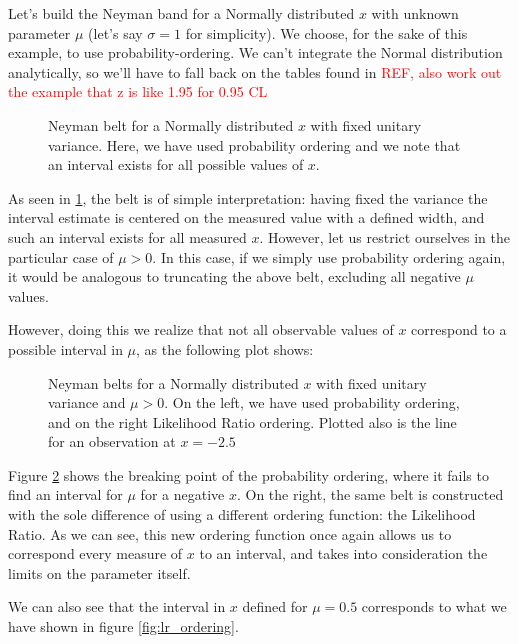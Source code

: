 \begin{example}
\label{ex:LR_vs_p_ordering}
	Let's build the Neyman band for a Normally distributed $x$ with unknown parameter $\mu$ (let's say $\sigma=1$ for simplicity). We choose, for the sake of this example, to use probability-ordering. We can't integrate the Normal distribution analytically, so we'll have to fall back on the tables found in \textcolor{red}{REF, also work out the example that z is like 1.95 for 0.95 CL}
	
	\begin{figure}[H]
		\centering
		
		\caption{Neyman belt for a Normally distributed $x$ with fixed unitary variance. Here, we have used probability ordering and we note that an interval exists for all possible values of $x$.}
		\label{fig:neyman_gauss}
	\end{figure}
	
	As seen in \ref{fig:neyman_gauss}, the belt is of simple interpretation: having fixed the variance the interval estimate is centered on the measured value with a defined width, and such an interval exists for all measured $x$. However, let us restrict ourselves in the particular case of $\mu>0$. In this case, if we simply use probability ordering again, it would be analogous to truncating the above belt, excluding all negative $\mu$ values.
	
	However, doing this we realize that not all observable values of $x$ correspond to a possible interval in $\mu$, as the following plot shows:
	
	\begin{figure}[H]
		\centering
		
		\caption{Neyman belts for a Normally distributed $x$ with fixed unitary variance and $\mu>0$. On the left, we have used probability ordering, and on the right Likelihood Ratio ordering. Plotted also is the line for an observation at $x=-2.5$}
		\label{fig:neyman_gauss_limited}
	\end{figure}
	
	Figure \ref{fig:neyman_gauss_limited} shows the breaking point of the probability ordering, where it fails to find an interval for $\mu$ for a negative $x$. On the right, the same belt is constructed with the sole difference of using a different ordering function: the Likelihood Ratio. As we can see, this new ordering function once again allows us to correspond every measure of $x$ to an interval, and takes into consideration the limits on the parameter itself. 
	
	We can also see that the interval in $x$ defined for $\mu=0.5$ corresponds to what we have shown in figure \ref{fig:lr_ordering}.
\end{example}

